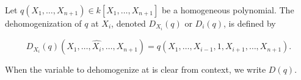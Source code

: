 Let $q(X_1, \ldots, X_{n+1}) \in k[X_1, \ldots, X_{n+1}]$ be a homogeneous polynomial. The dehomogenization of $q$ at $X_i$, denoted $D_{X_i}(q)$ or $D_i(q)$, is defined by

$$D_{X_i}(q)(X_1, \ldots, \widehat{X_i}, \ldots, X_{n+1}) = q(X_1, \ldots, X_{i-1}, 1, X_{i+1}, \ldots, X_{n+1}).$$

When the variable to dehomogenize at is clear from context, we write $D(q)$.
